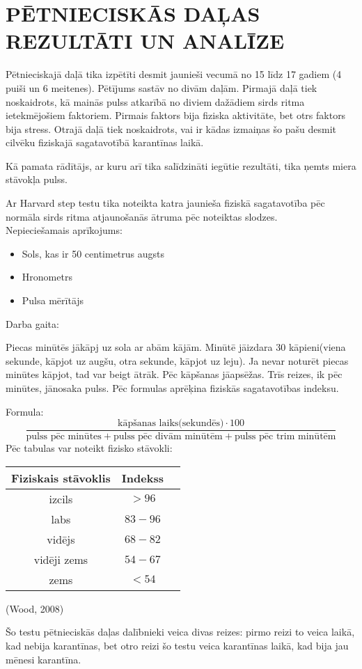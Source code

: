 \documentclass[12pt]{article}
\begin{document}
\newpage

\section{PĒTNIECISKĀS DAĻAS REZULTĀTI UN ANALĪZE}
Pētnieciskajā daļā tika izpētīti desmit jaunieši vecumā no 15 līdz 17 gadiem (4 puiši un 6 meitenes). Pētījums sastāv no divām daļām. Pirmajā daļā tiek noskaidrots, kā mainās pulss atkarībā no diviem  dažādiem sirds ritma ietekmējošiem faktoriem. Pirmais faktors bija fiziska aktivitāte, bet otrs faktors bija stress. Otrajā daļā tiek noskaidrots, vai ir kādas izmaiņas šo pašu desmit cilvēku fiziskajā sagatavotībā karantīnas laikā.\par
Kā pamata rādītājs, ar kuru arī tika salīdzināti iegūtie rezultāti, tika ņemts miera stāvokļa pulss.


Ar Harvard step testu tika noteikta katra jaunieša fiziskā sagatavotība pēc normāla sirds ritma atjaunošanās ātruma pēc noteiktas slodzes.\\
Nepieciešamais aprīkojums:
\begin{itemize}
\setlength\itemsep{-0.45em}
  \item Sols, kas ir 50 centimetrus augsts
  \item Hronometrs
  \item Pulsa mērītājs
\end{itemize}

Darba gaita:\par
Piecas minūtēs jākāpj uz sola ar abām kājām. Minūtē jāizdara 30 kāpieni(viena sekunde, kāpjot uz augšu, otra sekunde, kāpjot uz leju). Ja nevar noturēt piecas minūtes kāpjot, tad var beigt ātrāk. Pēc kāpšanas jāapsēžas. Trīs reizes, ik pēc minūtes, jānosaka pulss. Pēc formulas aprēķina fiziskās sagatavotības indeksu.\par
Formula:
$$\frac{\text{kāpšanas\ laiks(sekundēs)}\cdot 100}{\text{pulss\  pēc\  minūtes} + \text{pulss\ pēc\ divām\ minūtēm} + \text{pulss\ pēc\ trim\ minūtēm}}$$
Pēc tabulas var noteikt fizisko stāvokli: 
\begin{center}
    \begin{tabular}{|c|c|c|}
    \hline
    Fiziskais stāvoklis & Indekss\\\hline
    izcils & $>96$\\\hline
    labs & $83-96$\\\hline
    vidējs & $68-82$\\\hline
    vidēji zems & $54-67$\\\hline
    zems & $<54$\\
    \hline
    \end{tabular}
\end{center}
(Wood, 2008)\par
Šo testu pētnieciskās daļas dalībnieki veica divas reizes: pirmo reizi to veica laikā, kad nebija karantīnas, bet otro reizi šo testu veica karantīnas laikā, kad bija jau mēnesi karantīna. 
\end{document}
